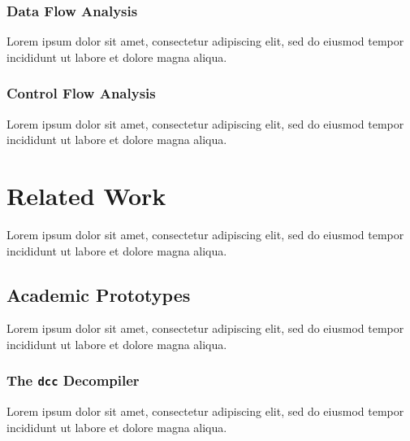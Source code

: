 \documentclass[12pt, a4paper]{article}
\begin{document}

\subsubsection{Data Flow Analysis}

Lorem ipsum dolor sit amet, consectetur adipiscing elit, sed do eiusmod tempor incididunt ut labore et dolore magna aliqua.

\cite{type_decomp}


\subsubsection{Control Flow Analysis}

Lorem ipsum dolor sit amet, consectetur adipiscing elit, sed do eiusmod tempor incididunt ut labore et dolore magna aliqua.


\section{Related Work}

Lorem ipsum dolor sit amet, consectetur adipiscing elit, sed do eiusmod tempor incididunt ut labore et dolore magna aliqua.


\subsection{Academic Prototypes}

Lorem ipsum dolor sit amet, consectetur adipiscing elit, sed do eiusmod tempor incididunt ut labore et dolore magna aliqua.


\subsubsection{The \texttt{dcc} Decompiler}

Lorem ipsum dolor sit amet, consectetur adipiscing elit, sed do eiusmod tempor incididunt ut labore et dolore magna aliqua.
\end{document}
